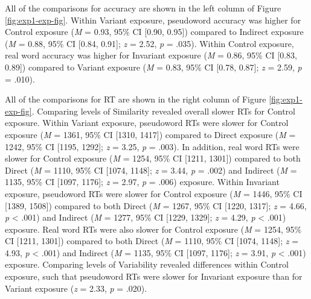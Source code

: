 \documentclass[preprint, 3p, authoryear]{elsarticle} %
\begin{document}
All of the comparisons for accuracy are shown in the left column of Figure \ref{fig:exp1-exp-fig}.
Within Variant exposure, pseudoword accuracy was higher for Control exposure (\emph{M} = 0.93, 95\% CI {[}0.90, 0.95{]}) compared to Indirect exposure (\emph{M} = 0.88, 95\% CI {[}0.84, 0.91{]}; \emph{z} = 2.52, \emph{p} = .035).
Within Control exposure, real word accuracy was higher for Invariant exposure (\emph{M} = 0.86, 95\% CI {[}0.83, 0.89{]}) compared to Variant exposure (\emph{M} = 0.83, 95\% CI {[}0.78, 0.87{]}; \emph{z} = 2.59, \emph{p} = .010).

All of the comparisons for RT are shown in the right column of Figure \ref{fig:exp1-exp-fig}.
Comparing levels of Similarity revealed overall slower RTs for Control exposure.
Within Variant exposure, pseudoword RTs were slower for Control exposure (\emph{M} = 1361, 95\% CI {[}1310, 1417{]}) compared to Direct exposure (\emph{M} = 1242, 95\% CI {[}1195, 1292{]}; \emph{z} = 3.25, \emph{p} = .003).
In addition, real word RTs were slower for Control exposure (\emph{M} = 1254, 95\% CI {[}1211, 1301{]}) compared to both Direct (\emph{M} = 1110, 95\% CI {[}1074, 1148{]}; \emph{z} = 3.44, \emph{p} = .002) and Indirect (\emph{M} = 1135, 95\% CI {[}1097, 1176{]}; \emph{z} = 2.97, \emph{p} = .006) exposure.
Within Invariant exposure, pseudoword RTs were slower for Control exposure (\emph{M} = 1446, 95\% CI {[}1389, 1508{]}) compared to both Direct (\emph{M} = 1267, 95\% CI {[}1220, 1317{]}; \emph{z} = 4.66, \emph{p} \textless{} .001) and Indirect (\emph{M} = 1277, 95\% CI {[}1229, 1329{]}; \emph{z} = 4.29, \emph{p} \textless{} .001) exposure.
Real word RTs were also slower for Control exposure (\emph{M} = 1254, 95\% CI {[}1211, 1301{]}) compared to both Direct (\emph{M} = 1110, 95\% CI {[}1074, 1148{]}; \emph{z} = 4.93, \emph{p} \textless{} .001) and Indirect (\emph{M} = 1135, 95\% CI {[}1097, 1176{]}; \emph{z} = 3.91, \emph{p} \textless{} .001) exposure.
Comparing levels of Variability revealed differences within Control exposure, such that pseudoword RTs were slower for Invariant exposure than for Variant exposure (\emph{z} = 2.33, \emph{p} = .020).
\end{document}
